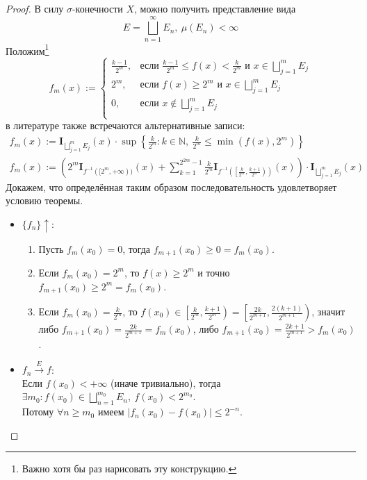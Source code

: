 \documentclass[11pt,a4paper]{report}
\def\Natural{\mathbb{N}}
\theoremstyle{definition}
\theoremstyle{definition}
\theoremstyle{definition}
\begin{document}
		\begin{proof}
			В силу $ \sigma $-конечности $ X $, можно получить представление вида 
			\[ 
				E = \bigsqcup\limits_{n=1}^{\infty} E_{n},\ \mu(E_{n}) < \infty
			\]
			Положим\footnote{Важно хотя бы раз нарисовать эту конструкцию.} 
			\[ f_{m}(x) := 
				\begin{cases} 
					\frac{k-1}{2^{m}}, & \text{если } \frac{k-1}{2^{m}} \le f(x) < \frac{k}{2^{m}} \text{ и } x \in \bigsqcup\limits_{j=1}^{m} E_{j}\\
					2^{m}, & \text{если } f(x) \ge 2^{m} \text{ и } x \in \bigsqcup\limits_{j=1}^{m} E_{j}\\
					0, & \text{если } x \not \in \bigsqcup\limits_{j=1}^{m} E_{j}\\
				\end{cases} 
			\]
			в литературе также встречаются альтернативные записи:
			\begin{gather*}
				f_{m}(x) := \mathbf{I}_{\bigsqcup\limits_{j=1}^{m} E_{j}}(x) \cdot \sup \left \{ \frac{k}{2^{m}}: k \in \Natural,\ \frac{k}{2^{m}} \le \min(f(x), 2^{m}) \right \}\\
				f_{m}(x) := \left (2^{m} \mathbf{I}_{f^{-1}([2^{m}, +\infty))}(x) + \sum\limits_{k=1}^{2^{2m}-1} \frac{k}{2^{m}} \mathbf{I}_{f^{-1}\left (\left [\frac{k}{2^{m}}, \frac{k+1}{2^{m}}\right )\right )}(x)\right ) \cdot \mathbf{I}_{\bigsqcup\limits_{j=1}^{m} E_{j}}(x)
			\end{gather*}
			Докажем, что определённая таким образом последовательность удовлетворяет условию теоремы.
			\begin{itemize}
				\item $ \{f_{n}\} \uparrow $:
					\begin{enumerate}
						\item Пусть $ f_{m}(x_{0}) = 0 $, тогда $ f_{m+1}(x_{0}) \ge 0 = f_{m}(x_{0}) $.
						\item Если $ f_{m}(x_{0}) = 2^{m} $, то $ f(x) \ge 2^{m} $ и точно $ f_{m+1}(x_{0}) \ge 2^{m} = f_{m}(x_{0}) $.
						\item Если $ f_{m}(x_{0}) = \frac{k}{2^{m}} $, то $ f(x_{0}) \in \left[ \frac{k}{2^{m}}, \frac{k+1}{2^{m}} \right) = \left[ \frac{2k}{2^{m+1}}, \frac{2(k+1)}{2^{m+1}} \right) $, значит либо $ f_{m+1}(x_{0}) = \frac{2k}{2^{m+1}} = f_{m}(x_{0}) $, либо $ f_{m+1}(x_{0}) = \frac{2k+1}{2^{m+1}} > f_{m}(x_{0}) $.
					\end{enumerate}
				\item $ f_{n} \xrightarrow{E} f $:\\
				Если $ f(x_{0}) < +\infty $ (иначе тривиально), тогда $ \exists m_{0}: f(x_{0}) \in \bigsqcup\limits_{n=1}^{m_{0}} E_{n},\ f(x_{0}) < 2^{m_{0}} $.\\ 
				Потому $ \forall n \ge m_{0} $ имеем $ |f_{n}(x_{0}) - f(x_{0})| \le 2^{-n} $.
			\end{itemize}
		\end{proof}
\end{document}
